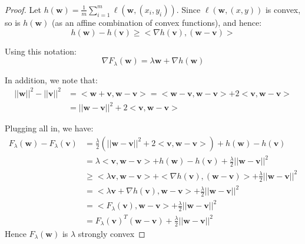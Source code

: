 \subsubsection{}
\begin{proof}    
    Let $h(\pmb{w}) = \frac{1}{m}\sum_{i=1}^m \ell\left(\pmb{w}, (x_i, y_i)\right)$. Since $\ell\left(\pmb{w}, (x, y)\right)$ is convex, so is $h(\pmb{w})$ (as an affine combination of convex functions), and hence:
    \begin{equation*}
        h(\pmb{w}) - h(\pmb{v}) \geq <\nabla h(\pmb{v}), (\pmb{w}-\pmb{v})>
    \end{equation*}
    
    Using this notation:
    \begin{equation*}
        \nabla F_\lambda(\pmb{w}) = \lambda \pmb{w} + \nabla h(\pmb{w})
    \end{equation*}

    In addition, we note that:    
    \begin{equation*}
        \begin{split}            
            ||\pmb{w}||^2 - ||\pmb{v}||^2 &= <\pmb{w} + \pmb{v}, \pmb{w} - \pmb{v}> = <\pmb{w} - \pmb{v}, \pmb{w} - \pmb{v}> + 2 <\pmb{v}, \pmb{w} - \pmb{v}> \\
            &= ||\pmb{w} - \pmb{v}||^2 + 2 <\pmb{v}, \pmb{w} - \pmb{v}>
        \end{split}
    \end{equation*}
    
    Plugging all in, we have:
    \begin{equation*}
        \begin{split}
            F_\lambda(\pmb{w}) - F_\lambda(\pmb{v}) &= \frac{\lambda}{2}(||\pmb{w} - \pmb{v}||^2 + 2 <\pmb{v}, \pmb{w} - \pmb{v}>) + h(\pmb{w}) - h(\pmb{v}) \\ 
            &=  \lambda <\pmb{v}, \pmb{w} - \pmb{v}> + h(\pmb{w}) - h(\pmb{v}) + \frac{\lambda}{2}||\pmb{w} - \pmb{v}||^2 \\
            &\geq <\lambda\pmb{v}, \pmb{w} - \pmb{v}> + <\nabla h(\pmb{v}), (\pmb{w}-\pmb{v})> + \frac{\lambda}{2}||\pmb{w} - \pmb{v}||^2 \\
            &= <\lambda\pmb{v} + \nabla h(\pmb{v}), \pmb{w} - \pmb{v}> + \frac{\lambda}{2}||\pmb{w} - \pmb{v}||^2 \\
            &= <F_\lambda(\pmb{v}), \pmb{w} - \pmb{v}> + \frac{\lambda}{2}||\pmb{w} - \pmb{v}||^2 \\
            &= F_\lambda(\pmb{v})^T (\pmb{w} - \pmb{v}) + \frac{\lambda}{2}||\pmb{w} - \pmb{v}||^2
        \end{split}
    \end{equation*}
    Hence $F_\lambda(\pmb{w})$ is $\lambda$ strongly convex
\end{proof}

